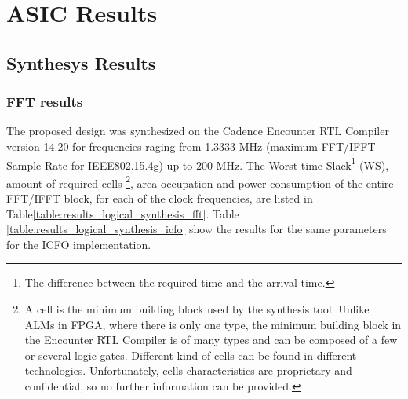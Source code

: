 \chapter{ASIC Results}

\section{Synthesys Results }

\subsection{FFT results}

The proposed design was synthesized on the Cadence Encounter RTL Compiler version 14.20 for frequencies raging from 1.3333 MHz (maximum FFT/IFFT Sample Rate for IEEE802.15.4g) up to 200 MHz. The Worst time Slack\footnote{The difference between the required time and the arrival time.} (WS), amount of required cells \footnote{A cell is the minimum building block used by the synthesis tool. Unlike ALMs in FPGA, where there is only one type, the minimum building block in the Encounter RTL Compiler is of many types and can be composed of a few or several logic gates. Different kind of cells can be found in different technologies. Unfortunately, cells characteristics are proprietary and confidential, so no further information can be provided.}, area occupation and power consumption of the entire FFT/IFFT block, for each of the clock frequencies, are listed in Table\ref{table:results_logical_synthesis_fft}. Table \ref{table:results_logical_synthesis_icfo} show the results for the same parameters for the ICFO implementation. 

